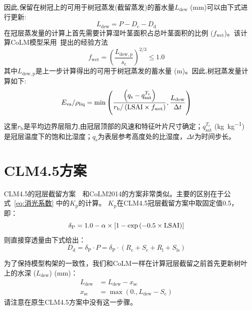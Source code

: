 因此,保留在树冠上的可用于树冠蒸发(截留蒸发)的蓄水量$L_{\mathrm{dew}}$ (mm)可以由下式进行更新:
\begin{equation}
  L_{\mathrm{dew}}={P}-D_{\mathrm{c}}-D_{\mathrm{d}}
\end{equation}
在冠层蒸发量的计算上首先需要计算湿叶茎面积占总叶茎面积的比例 ($f_{\mathrm{wet}}$)。该计算CoLM模型采用~\citet{dickinson1993biosphere}提出的经验方法
\begin{equation}
  f_{\mathrm{{wet}}}=\left(\frac{L_{\mathrm{dew, p}}}{s_{\mathrm{c}}}\right)^{2 / 3} \leqslant 1.0
\end{equation}
其中$L_{\mathrm{dew, p}}$是上一步计算得出的可用于树冠蒸发的蓄水量 (m)。因此,树冠蒸发量计算如下:
\begin{equation}
  E_{\mathrm{va}} / \rho_{\mathrm{liq}}=\min \left(\frac{\left(q_{\mathrm{s}}-q_{\mathrm{sat}}^{T_{\mathrm{c}}}\right)}{r_{\mathrm{b}} /\left({\rm LSAI} \times f_{\mathrm{wet}}\right)}, \frac{L_{\mathrm{dew}}}{\Delta t}\right)
\end{equation}
这里$r_{\mathrm {b}} $是平均边界层阻力,由冠层顶部的风速和特征叶片尺寸确定；$q_{\mathrm{sat}}^{T_{\mathrm {c}} }$ (\unit{kg.kg^{-1}})是冠层温度下的饱和比湿度；$q_{\mathrm {s}} $为表层参考高度处的比湿度，$\Delta t$为时间步长。


\section{CLM4.5方案}
CLM4.5的冠层截留方案~\citep{oleson2013technical}~和CoLM2014的方案非常类似。主要的区别在于公式~\eqref{eq:消光系数} 中的$K_{\mathrm {p}} $的计算。
$K_{\mathrm {p}} $在CLM4.5冠层截留方案中取固定值0.5，即：
%
\begin{equation}
  \delta_{\mathrm{P}}=1.0-\alpha \times\left[1-\exp \left(-0.5 \times {\rm LSAI}\right)\right]
\end{equation}
则直接穿透量由下式给出：
\begin{equation}
  D_{\mathrm{d}}=\delta_{\mathrm{P}} \cdot P=\delta_{\mathrm{P}} \cdot\left(R_{\mathrm{c}}+S_{\mathrm{c}}+R_{\mathrm{l}}+S_{\mathrm{l s}}\right)
\end{equation}

为了保持模型构架的一致性，我们和CoLM一样在计算冠层截留之前首先更新树叶上的水深 ($L_{\mathrm{dew}}$) (mm)：
\begin{equation}
  \begin{aligned}
    L_{\mathrm{dew}} &= L_{\mathrm{dew}}-x_{\mathrm{sc}} \\
    x_{\mathrm{s c}} &= \max \left(0., L_{\mathrm{dew}}-S_{\mathrm{c}}\right)
  \end{aligned}
\end{equation}
请注意在原生CLM4.5方案中没有这一步骤。

